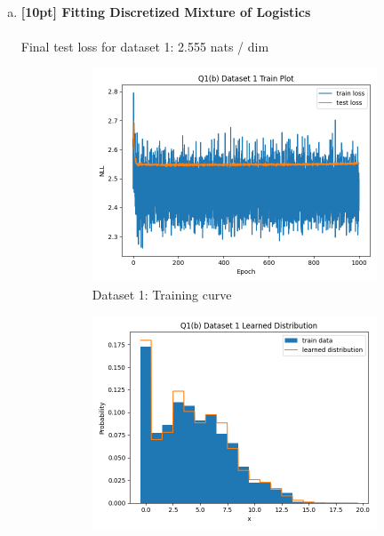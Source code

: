 \documentclass{article}
\begin{document}
\begin{enumerate}[(a)]
\newpage

\item {\bf [10pt] Fitting Discretized Mixture of Logistics} \\\\
Final test loss for dataset 1: 2.555  nats / dim
\begin{figure}[H]
    \centering
    \begin{subfigure}{0.45\textwidth}
        \centering
        \includegraphics[width=\textwidth]{figures/q1_b_dset1_train_plot.png}
        \caption{Dataset 1: Training curve}
    \end{subfigure}
    \hspace{0.2in}
    \begin{subfigure}{0.45\textwidth}
        \centering
        \includegraphics[width=\textwidth]{figures/q1_b_dset1_learned_dist.png}

\end{subfigure}
\end{figure}
\end{enumerate}
\end{document}
